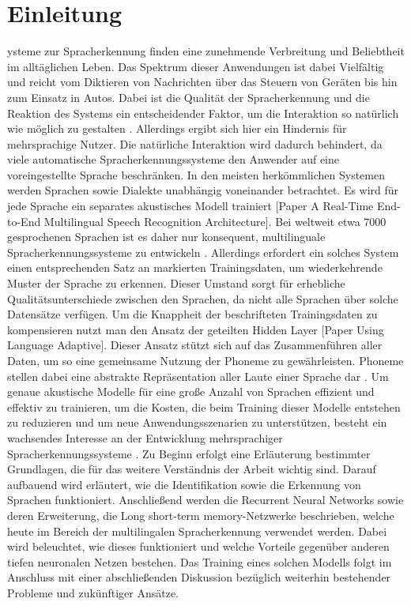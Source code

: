 \section{Einleitung}\label{sec:introduction}
ysteme zur Spracherkennung finden eine zunehmende Verbreitung und Beliebtheit im alltäglichen Leben. Das Spektrum dieser Anwendungen ist dabei Vielfältig und reicht vom Diktieren von Nachrichten über das Steuern von Geräten bis hin zum Einsatz in Autos. Dabei ist die Qualität der Spracherkennung und die Reaktion des Systems ein entscheidender Faktor, um die Interaktion so natürlich wie möglich zu gestalten \cite{Yu.2014}. Allerdings ergibt sich hier ein Hindernis für mehrsprachige Nutzer. Die natürliche Interaktion wird dadurch behindert, da viele automatische Spracherkennungssysteme den Anwender auf eine voreingestellte Sprache beschränken. In den meisten herkömmlichen Systemen werden Sprachen sowie Dialekte unabhängig voneinander betrachtet. Es wird für jede Sprache ein separates akustisches Modell trainiert [Paper A Real-Time End-to-End Multilingual Speech Recognition Architecture]. Bei weltweit etwa 7000 gesprochenen Sprachen ist es daher nur konsequent, multilinguale Spracherkennungssysteme zu entwickeln \cite{Gary.2018}. Allerdings erfordert ein solches System einen entsprechenden Satz an markierten Trainingsdaten, um wiederkehrende Muster der Sprache zu erkennen.
Dieser Umstand sorgt für erhebliche Qualitätsunterschiede zwischen den Sprachen, da nicht alle Sprachen über solche Datensätze verfügen. Um die Knappheit der beschrifteten Trainingsdaten zu kompensieren nutzt man den Ansatz der geteilten Hidden Layer [Paper Using Language Adaptive]. Dieser Ansatz stützt sich auf das Zusammenführen aller Daten, um so eine gemeinsame Nutzung der Phoneme zu gewährleisten.  Phoneme stellen dabei eine abstrakte Repräsentation aller Laute einer Sprache dar . Um genaue akustische Modelle für eine große Anzahl von Sprachen effizient und effektiv zu trainieren, um die Kosten, die beim Training dieser Modelle entstehen zu reduzieren und um neue Anwendungsszenarien zu unterstützen, besteht ein wachsendes Interesse an der Entwicklung mehrsprachiger Spracherkennungssysteme \cite{Yu.2014}.
Zu Beginn erfolgt eine Erläuterung bestimmter Grundlagen, die für das weitere Verständnis der Arbeit wichtig sind. Darauf aufbauend wird erläutert, wie die Identifikation sowie die Erkennung von Sprachen funktioniert. Anschließend werden die Recurrent Neural Networks sowie deren Erweiterung, die Long short-term memory-Netzwerke beschrieben, welche heute im Bereich der multilingalen Spracherkennung verwendet werden. Dabei wird beleuchtet, wie dieses funktioniert und welche Vorteile gegenüber anderen tiefen neuronalen Netzen bestehen. Das Training eines solchen Modells folgt im Anschluss mit einer abschließenden Diskussion bezüglich weiterhin bestehender Probleme und zukünftiger Ansätze.

